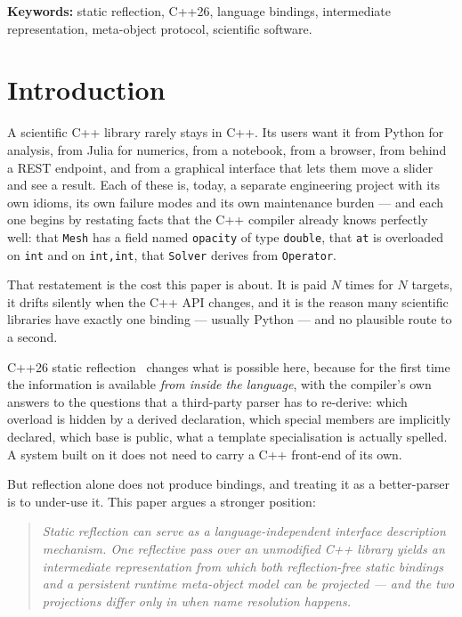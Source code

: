 \documentclass[11pt,a4paper]{article}
\newcommand{\code}[1]{\texttt{\small #1}}
\begin{document}
\noindent\textbf{Keywords:} static reflection, C++26, language bindings,
intermediate representation, meta-object protocol, scientific software.

\section{Introduction}
\label{sec:intro}

A scientific C++ library rarely stays in C++. Its users want it from Python for
analysis, from Julia for numerics, from a notebook, from a browser, from behind
a REST endpoint, and from a graphical interface that lets them move a slider and
see a result. Each of these is, today, a separate engineering project with its
own idioms, its own failure modes and its own maintenance burden --- and each
one begins by restating facts that the C++ compiler already knows perfectly
well: that \code{Mesh} has a field named \code{opacity} of type \code{double},
that \code{at} is overloaded on \code{int} and on \code{int,int}, that
\code{Solver} derives from \code{Operator}.

That restatement is the cost this paper is about. It is paid $N$ times for $N$
targets, it drifts silently when the C++ API changes, and it is the reason many
scientific libraries have exactly one binding --- usually Python --- and no
plausible route to a second.

C++26 static reflection~\cite{p2996} changes what is possible here, because for
the first time the information is available \emph{from inside the language},
with the compiler's own answers to the questions that a third-party parser has
to re-derive: which overload is hidden by a derived declaration, which special
members are implicitly declared, which base is public, what a template
specialisation is actually spelled. A system built on it does not need to carry
a C++ front-end of its own.

But reflection alone does not produce bindings, and treating it as a
better-parser is to under-use it. This paper argues a stronger position:

\begin{quote}\itshape
Static reflection can serve as a language-independent interface description
mechanism. One reflective pass over an unmodified C++ library yields an
intermediate representation from which \emph{both} reflection-free static
bindings \emph{and} a persistent runtime meta-object model can be projected ---
and the two projections differ only in when name resolution happens.
\end{quote}
\end{document}
